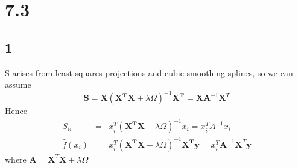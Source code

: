 \documentclass[11pt, oneside]{article}   	%
\begin{document}
\section{7.3}
\subsection{1}
    S arises from least squares projections and cubic smoothing splines, so we can assume
    \begin{equation}
        \mathbf{S} = \mathbf{X} (\mathbf{X^T X} + \lambda \Omega)^{-1} \mathbf{X^T} = \mathbf{XA}^{-1} \mathbf{X}^T \nonumber
    \end{equation}
    Hence
    \begin{eqnarray}
        S_{ii} &=& x_i^T (\mathbf{X^T X} + \lambda \Omega)^{-1} x_i = x_i^T A^{-1} x_i \nonumber \\
        \hat{f}(x_i) &=& x_i^T (\mathbf{X^T X} + \lambda \Omega)^{-1} \mathbf{X^T y} = x_i^T \mathbf{A}^{-1} \mathbf{X}^T \mathbf{y} \nonumber
    \end{eqnarray}
    where $ \mathbf{A} = \mathbf{X}^T \mathbf{X} + \lambda \Omega $
\end{document}

